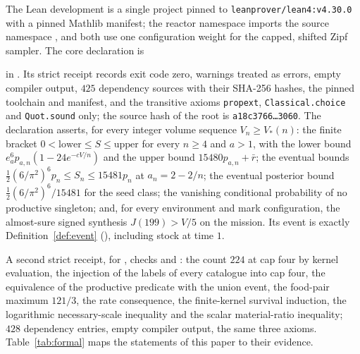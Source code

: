 \documentclass[11pt,letterpaper]{article}
\theoremstyle{plain}
\theoremstyle{definition}
\theoremstyle{remark}
\numberwithin{equation}{section}
\begin{document}
The Lean development is a single project pinned to \texttt{leanprover/lean4:v4.30.0} with a pinned Mathlib manifest; the reactor namespace  imports the source namespace , and both use one configuration weight for the capped, shifted Zipf sampler. The core declaration is
\begin{center}\small{}\end{center}
in . Its strict receipt records exit code zero, warnings treated as errors, empty compiler output, $425$ dependency sources with their SHA-256 hashes, the pinned toolchain and manifest, and the transitive axioms \texttt{propext}, \texttt{Classical.choice} and \texttt{Quot.sound} only; the source hash of the root is \texttt{a18c3766\ldots3060}. The declaration asserts, for every integer volume sequence $V_n\ge V_*(n)$: the finite bracket $0<\text{lower}\le S\le\text{upper}$ for every $n\ge4$ and $a>1$, with the lower bound $e_a^6p_{a,n}(1-24e^{-cV/n})$ and the upper bound $15480p_{a,n}+\bar r$; the eventual bounds $\tfrac12(6/\pi^2)^6p_n\le S_n\le15481p_n$ at $a_n=2-2/n$; the eventual posterior bound $\tfrac12(6/\pi^2)^6/15481$ for the seed class; the vanishing conditional probability of no productive singleton; and, for every environment and mark configuration, the almost-sure signed synthesis $J(199)>V/5$ on the mission. Its event is exactly Definition~\ref{def:event} (), including stock at time $1$.

A second strict receipt, for , checks  and : the count $224$ at cap four by kernel evaluation, the injection of the labels of every catalogue into cap four, the equivalence of the productive predicate with the union event, the food-pair maximum $121/3$, the rate consequence, the finite-kernel survival induction, the logarithmic necessary-scale inequality and the scalar material-ratio inequality; $428$ dependency entries, empty compiler output, the same three axioms. Table~\ref{tab:formal} maps the statements of this paper to their evidence.
\end{document}
